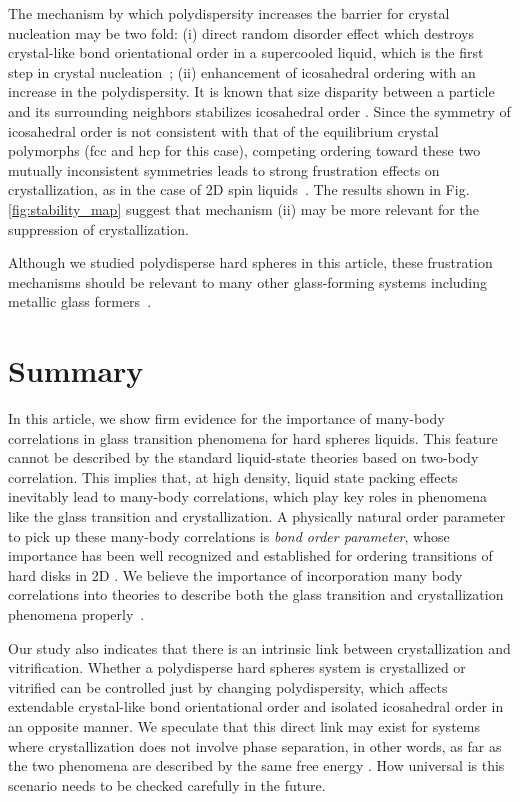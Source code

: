 \documentclass[twocolumn,superscriptaddress]{revtex4}
\begin{document}
The mechanism by which polydispersity increases the barrier for crystal nucleation may be two fold: 
(i) direct random disorder effect which destroys crystal-like bond orientational order in a supercooled liquid,
which is the first step in crystal nucleation~\cite{russo_hs};
(ii) enhancement of icosahedral ordering with an increase in the polydispersity.
It is known that size disparity between a particle and its surrounding neighbors stabilizes icosahedral order \cite{Shimono2012}. 
Since the symmetry of icosahedral order is not consistent with that of the equilibrium crystal polymorphs (fcc and hcp for this case), 
competing ordering toward these two mutually inconsistent symmetries leads to strong frustration effects on crystallization, as in the case of 
2D spin liquids~\cite{ShintaniNP,STNM}. 
The results shown in Fig. \ref{fig:stability_map} suggest that mechanism (ii) may be more relevant for the suppression of crystallization. 

Although we studied polydisperse hard spheres in this article, these frustration mechanisms should be relevant to many other 
glass-forming systems including metallic glass formers~\cite{Jakse2008,Hwang2012}. 

\section{Summary}


In this article, we show firm evidence for the importance of many-body correlations in glass transition phenomena 
for hard spheres liquids. This feature cannot be described by the standard liquid-state theories based on two-body correlation. 
This implies that, at high density, liquid state packing effects inevitably lead to many-body correlations, which play 
key roles in phenomena like the glass transition and crystallization. 
A physically natural order parameter to pick up these many-body correlations is \emph{bond order parameter}, whose importance 
has been well recognized and established for ordering transitions of hard disks in 2D \cite{NelsonB}. 
We believe the importance of incorporation many body correlations into theories to describe
both the glass transition and crystallization phenomena properly~\cite{TanakaJSP,TanakaR}.

Our study also indicates that there is an intrinsic link between crystallization and vitrification. 
Whether a polydisperse hard spheres system is crystallized or vitrified can be controlled just by changing 
polydispersity, which affects extendable crystal-like bond orientational order and isolated icosahedral order 
in an opposite manner.
We speculate that this direct link may exist for systems where crystallization does not involve phase separation, 
in other words, as far as the two phenomena are described by the same free energy \cite{TanakaGJPCM,TanakaJSP,TanakaR}.  
How universal is this scenario needs to be checked carefully in the future. 
\end{document}
